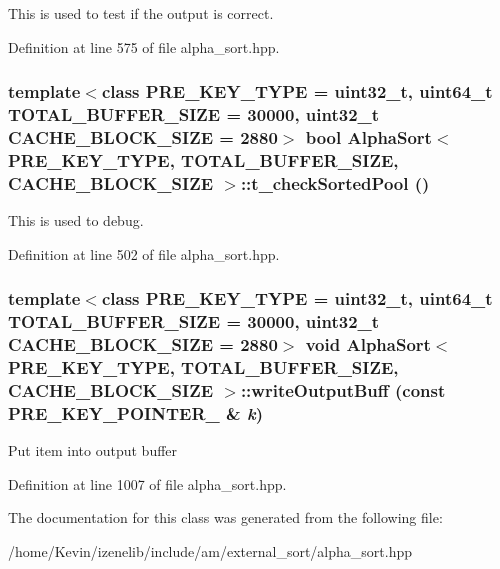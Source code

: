 This is used to test if the output is correct. 

Definition at line 575 of file alpha\_\-sort.hpp.\hypertarget{classAlphaSort_e26e16f0a99aa238edbf9bacaf4d8eec}{
\subsubsection[{t\_\-checkSortedPool}]{\setlength{\rightskip}{0pt plus 5cm}template$<$class PRE\_\-KEY\_\-TYPE  = uint32\_\-t, uint64\_\-t TOTAL\_\-BUFFER\_\-SIZE = 30000, uint32\_\-t CACHE\_\-BLOCK\_\-SIZE = 2880$>$ bool {\bf AlphaSort}$<$ PRE\_\-KEY\_\-TYPE, TOTAL\_\-BUFFER\_\-SIZE, CACHE\_\-BLOCK\_\-SIZE $>$::t\_\-checkSortedPool ()}}
\label{classAlphaSort_e26e16f0a99aa238edbf9bacaf4d8eec}


This is used to debug. 

Definition at line 502 of file alpha\_\-sort.hpp.\hypertarget{classAlphaSort_3c3ebaf5f3c3f82d6060627c85e53c1b}{
\subsubsection[{writeOutputBuff}]{\setlength{\rightskip}{0pt plus 5cm}template$<$class PRE\_\-KEY\_\-TYPE  = uint32\_\-t, uint64\_\-t TOTAL\_\-BUFFER\_\-SIZE = 30000, uint32\_\-t CACHE\_\-BLOCK\_\-SIZE = 2880$>$ void {\bf AlphaSort}$<$ PRE\_\-KEY\_\-TYPE, TOTAL\_\-BUFFER\_\-SIZE, CACHE\_\-BLOCK\_\-SIZE $>$::writeOutputBuff (const PRE\_\-KEY\_\-POINTER\_\- \& {\em k})}}
\label{classAlphaSort_3c3ebaf5f3c3f82d6060627c85e53c1b}


Put item into output buffer 

Definition at line 1007 of file alpha\_\-sort.hpp.

The documentation for this class was generated from the following file:\begin{CompactItemize}
\item 
/home/Kevin/izenelib/include/am/external\_\-sort/alpha\_\-sort.hpp\end{CompactItemize}
